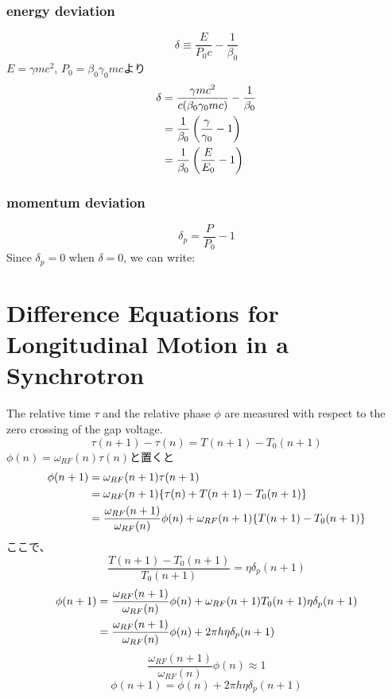 \documentclass[10pt,a4paper]{ltjsarticle}
\begin{document}
\subsubsection{energy deviation}
%
\begin{equation}
    \delta \equiv \frac{E}{P_0 c} -\frac{1}{\beta_0}
\end{equation}
%
$E =\gamma m c^2$, $P_0 =\beta_0\gamma_0 mc$より
%
\begin{align}
    \delta &= \frac{\gamma m c^2}{c(\beta_0\gamma_0 m c)} - \frac{1}{\beta_0} \notag \\
    & = \frac{1}{\beta_0}\left(\frac{\gamma}{\gamma_0} - 1\right) \notag \\
    & = \frac{1}{\beta_0}\left(\frac{E}{E_0}-1\right)
\end{align}
%
\subsubsection{momentum deviation}
%
\begin{equation}
    \delta_p = \frac{P}{P_0} -1
\end{equation}
%
Since $\delta_p = 0$ when $\delta = 0$, we can write:
%
\section{Difference Equations for Longitudinal Motion in a Synchrotron}
The relative time $\tau$ and the relative phase $\phi$ are measured with respect to the zero crossing of the gap voltage. 
%
\begin{equation}
    \tau(n+1) - \tau(n) = T(n+1) -T_0(n+1)
\end{equation}
%
$\phi(n) = \omega_{RF}(n) \tau(n)$と置くと
\begin{align}
    \phi(n+1) &= \omega_{RF}(n+1)\tau(n+1) \notag \\
    &=\omega_{RF}(n+1)\{\tau(n) + T(n+1) -T_0(n+1)\} \notag \\
    &= \frac{\omega_{RF}(n+1)}{\omega_{RF}(n)} \phi(n) + \omega_{RF}(n+1)\{T(n+1) -T_0(n+1)\}  \notag
\end{align}
%
ここで、
%
\begin{equation}
    \frac{T(n+1)-T_0(n+1)}{T_0(n+1)} = \eta \delta_p(n+1)
\end{equation}
%
\begin{align}
    \phi(n+1) &= \frac{\omega_{RF}(n+1)}{\omega_{RF}(n)}\phi(n) + \omega_{RF}(n+1)T_0(n+1)\eta \delta_p(n+1) \notag \\
    &=\frac{\omega_{RF}(n+1)}{\omega_{RF}(n)}\phi(n) + 2\pi h \eta \delta_p(n+1)
\end{align}
%
\begin{equation}
    \frac{\omega_{RF}(n+1)}{\omega_{RF}(n)}\phi(n) \approx 1
\end{equation}
%
\begin{equation}
    \phi(n+1) = \phi(n) + 2\pi h \eta \delta_p(n+1)
\end{equation}
\end{document}
